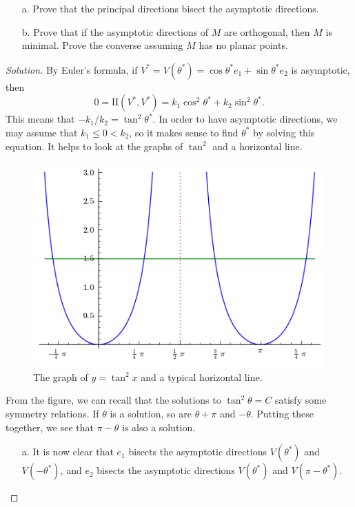 \documentclass[Shifrin_Solutions_Spring_2015]{subfiles}
\begin{document}
\begin{exercise}
\begin{itemize}
\item[a.] Prove that the principal directions bisect the asymptotic directions.
\item[b.] Prove that if the asymptotic directions of $M$ are orthogonal, then  $M$ is minimal. Prove the converse assuming $M$ has no planar points.
\end{itemize}
\end{exercise}

\begin{proof}[Solution]
By Euler's formula, if $V^{\ast}= V(\theta^\ast) = \cos \theta^{\ast} e_1 + \sin \theta^{\ast} e_2$ is asymptotic, then
\[
0 = \mathrm{II}(V^\ast, V^\ast) = k_1\cos^2\theta^\ast + k_2 \sin^2\theta^\ast .
\]
This means that $-k_1/k_2 = \tan^2 \theta^\ast$. In order to have asymptotic directions, we may assume that $k_1 \leq 0 < k_2$, so it makes sense to find $\theta^\ast$ by solving this equation. It helps to look at the graphs of $\tan^2$ and a horizontal line.

\begin{figure}[h]
\centering
\includegraphics[width=.5\textwidth]{picturebook/ch2sec2/tan2-graph}
\caption{The graph of $y= \tan^2 x$ and a typical horizontal line.}
\end{figure}

From the figure, we can recall that the solutions to $\tan^2\theta = C$ satisfy some symmetry relations. If $\theta$ is a solution, so are $\theta+ \pi$ and $-\theta$. Putting these together, we see that $\pi - \theta$ is also a solution.

\begin{itemize}
\item[a.] It is now clear that $e_1$ bisects the asymptotic directions $V(\theta^\ast)$ and $V(-\theta^\ast)$, and $e_2$ bisects the asymptotic directions $V(\theta^\ast)$ and $V(\pi - \theta^\ast)$.


\end{itemize}
\end{proof}
\end{document}
